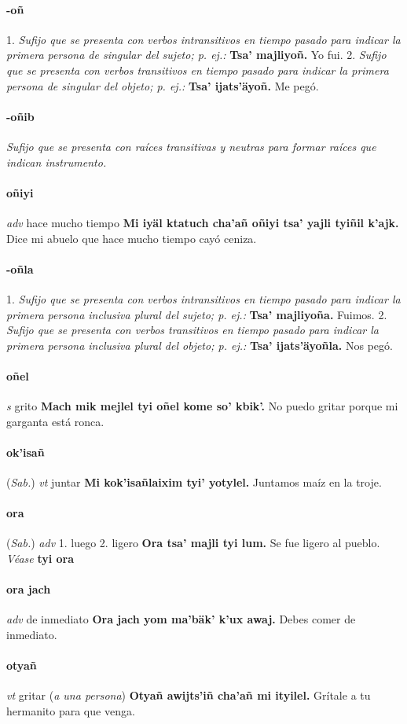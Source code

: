 \documentclass{scrbook}
\newcommand{\entry}[1]{\paragraph{#1}}
\newcommand{\onedefinition}[1]{#1.}
\newcommand{\nontranslationdef}[1]{\textit{#1}}
\newcommand{\partofspeech}[1]{\textit{#1}}
\newcommand{\spanishtranslation}[1]{#1}
\newcommand{\clarification}[1]{(\textit{#1})}
\newcommand{\cholexample}[1]{\textbf{#1}}
\newcommand{\exampletranslation}[1]{#1}
\newcommand{\alsosee}[1]{\\\textit{Véase} \textbf{#1}}
\newcommand{\relevantdialect}[1]{(\textit{#1})}
\begin{document}
\begin{multicols}{2}
\entry{-oñ}
\onedefinition{1}
\nontranslationdef{Sufijo que se presenta con verbos intransitivos en tiempo pasado para indicar la primera persona de singular del sujeto; p. ej.:}
\cholexample{Tsa' majliyoñ.}
\exampletranslation{Yo fui.}
\onedefinition{2}
\nontranslationdef{Sufijo que se presenta con verbos transitivos en tiempo pasado para indicar la primera persona de singular del objeto; p. ej.:}
\cholexample{Tsa' ijats'äyoñ.}
\exampletranslation{Me pegó.}

\entry{-oñib}
\nontranslationdef{Sufijo que se presenta con raíces transitivas y neutras para formar raíces que indican instrumento.}

\entry{oñiyi}
\partofspeech{adv}
\spanishtranslation{hace mucho tiempo}
\cholexample{Mi iyäl ktatuch cha'añ oñiyi tsa' yajli tyiñil k'ajk.}
\exampletranslation{Dice mi abuelo que hace mucho tiempo cayó ceniza.}

\entry{-oñla}
\onedefinition{1}
\nontranslationdef{Sufijo que se presenta con verbos intransitivos en tiempo pasado para indicar la primera persona inclusiva plural del sujeto; p. ej.:}
\cholexample{Tsa' majliyoña.}
\exampletranslation{Fuimos.}
\onedefinition{2}
\nontranslationdef{Sufijo que se presenta con verbos transitivos en tiempo pasado para indicar la primera persona inclusiva plural del objeto; p. ej.:}
\cholexample{Tsa' ijats'äyoñla.}
\exampletranslation{Nos pegó.}

\entry{oñel}
\partofspeech{s}
\spanishtranslation{grito}
\cholexample{Mach mik mejlel tyi oñel kome so' kbik'.}
\exampletranslation{No puedo gritar porque mi garganta está ronca.}

\entry{ok'isañ}
\relevantdialect{Sab.}
\partofspeech{vt}
\spanishtranslation{juntar}
\cholexample{Mi kok'isañlaixim tyi' yotylel.}
\exampletranslation{Juntamos maíz en la troje.}

\entry{ora}
\relevantdialect{Sab.}
\partofspeech{adv}
\onedefinition{1}
\spanishtranslation{luego}
\onedefinition{2}
\spanishtranslation{ligero}
\cholexample{Ora tsa' majli tyi lum.}
\exampletranslation{Se fue ligero al pueblo.}
\alsosee{tyi ora}

\entry{ora jach}
\partofspeech{adv}
\spanishtranslation{de inmediato}
\cholexample{Ora jach yom ma'bäk' k'ux awaj.}
\exampletranslation{Debes comer de inmediato.}

\entry{otyañ}
\partofspeech{vt}
\spanishtranslation{gritar}
\clarification{a una persona}
\cholexample{Otyañ awijts'iñ cha'añ mi ityilel.}
\exampletranslation{Grítale a tu hermanito para que venga.}


\end{multicols}
\end{document}
